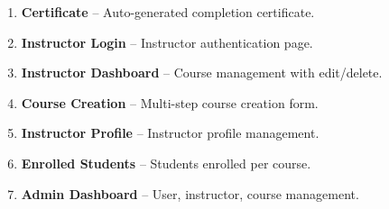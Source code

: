 \documentclass[12pt,a4paper]{report}
\begin{document}
\begin{enumerate}
    \item \textbf{Certificate} -- Auto-generated completion certificate.

    \item \textbf{Instructor Login} -- Instructor authentication page.

    \item \textbf{Instructor Dashboard} -- Course management with edit/delete.

    \item \textbf{Course Creation} -- Multi-step course creation form.

    \item \textbf{Instructor Profile} -- Instructor profile management.

    \item \textbf{Enrolled Students} -- Students enrolled per course.

    \item \textbf{Admin Dashboard} -- User, instructor, course management.
\end{enumerate}
\end{document}
